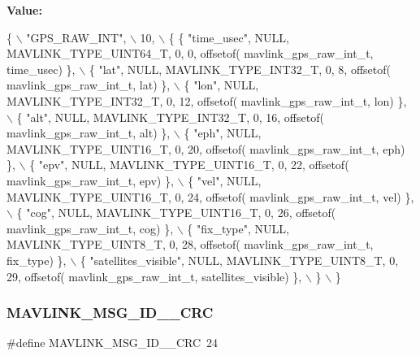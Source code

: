 {\bfseries Value\+:}
\begin{DoxyCode}
\{ \(\backslash\)
    \textcolor{stringliteral}{"GPS\_RAW\_INT"}, \(\backslash\)
    10, \(\backslash\)
    \{  \{ \textcolor{stringliteral}{"time\_usec"}, NULL, MAVLINK_TYPE_UINT64_T, 0, 0, offsetof(
      mavlink_gps_raw_int_t, time\_usec) \}, \(\backslash\)
         \{ \textcolor{stringliteral}{"lat"}, NULL, MAVLINK_TYPE_INT32_T, 0, 8, offsetof(
      mavlink_gps_raw_int_t, lat) \}, \(\backslash\)
         \{ \textcolor{stringliteral}{"lon"}, NULL, MAVLINK_TYPE_INT32_T, 0, 12, offsetof(
      mavlink_gps_raw_int_t, lon) \}, \(\backslash\)
         \{ \textcolor{stringliteral}{"alt"}, NULL, MAVLINK_TYPE_INT32_T, 0, 16, offsetof(
      mavlink_gps_raw_int_t, alt) \}, \(\backslash\)
         \{ \textcolor{stringliteral}{"eph"}, NULL, MAVLINK_TYPE_UINT16_T, 0, 20, offsetof(
      mavlink_gps_raw_int_t, eph) \}, \(\backslash\)
         \{ \textcolor{stringliteral}{"epv"}, NULL, MAVLINK_TYPE_UINT16_T, 0, 22, offsetof(
      mavlink_gps_raw_int_t, epv) \}, \(\backslash\)
         \{ \textcolor{stringliteral}{"vel"}, NULL, MAVLINK_TYPE_UINT16_T, 0, 24, offsetof(
      mavlink_gps_raw_int_t, vel) \}, \(\backslash\)
         \{ \textcolor{stringliteral}{"cog"}, NULL, MAVLINK_TYPE_UINT16_T, 0, 26, offsetof(
      mavlink_gps_raw_int_t, cog) \}, \(\backslash\)
         \{ \textcolor{stringliteral}{"fix\_type"}, NULL, MAVLINK_TYPE_UINT8_T, 0, 28, offsetof(
      mavlink_gps_raw_int_t, fix\_type) \}, \(\backslash\)
         \{ \textcolor{stringliteral}{"satellites\_visible"}, NULL, MAVLINK_TYPE_UINT8_T, 0, 29, offsetof(
      mavlink_gps_raw_int_t, satellites\_visible) \}, \(\backslash\)
         \} \(\backslash\)
\}
\end{DoxyCode}
\mbox{\label{mavlink__msg__gps__raw__int_8h_a0cc8dd1a1bc9b4179e0b74b3a8dfcb40}} 
\subsubsection{M\+A\+V\+L\+I\+N\+K\+\_\+\+M\+S\+G\+\_\+\+I\+D\+\_\+\_\+\+C\+RC}
{\footnotesize\ttfamily \#define M\+A\+V\+L\+I\+N\+K\+\_\+\+M\+S\+G\+\_\+\+I\+D\+\_\+\_\+\+C\+RC~24}

